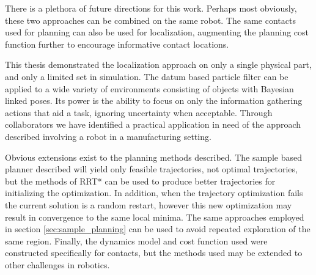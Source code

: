 \documentclass[../thesis.tex]{subfiles}
\begin{document}
There is a plethora of future directions for this work.
Perhaps most obviously, these two approaches can be combined on the same robot.
The same contacts used for planning can also be used for localization, augmenting the planning cost function further to encourage informative contact locations.

This thesis demonstrated the localization approach on only a single physical part, and only a limited set in simulation.
The datum based particle filter can be applied to a wide variety of environments consisting of objects with Bayesian linked poses.
Its power is the ability to focus on only the information gathering actions that aid a task, ignoring uncertainty when acceptable.
Through collaborators we have identified a practical application in need of the approach described involving a robot in a manufacturing setting.

Obvious extensions exist to the planning methods described. The sample based planner described will yield only feasible trajectories, not optimal trajectories, but the methods of RRT* can be used to produce better trajectories for initializing the optimization.
In addition, when the trajectory optimization fails the current solution is a random restart, however this new optimization may result in convergence to the same local minima.
The same approaches employed in section \ref{sec:sample_planning} can be used to avoid repeated exploration of the same region.
Finally, the dynamics model and cost function used were constructed specifically for contacts, but the methods used may be extended to other challenges in robotics.
\end{document}

